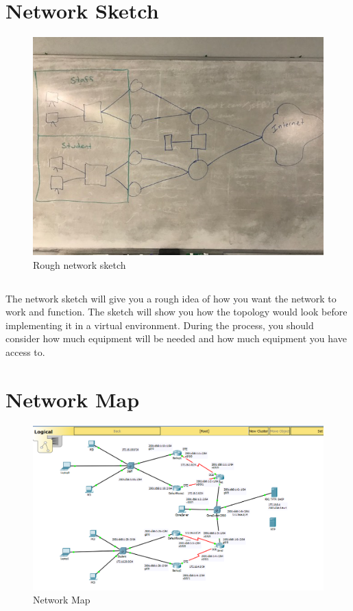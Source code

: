 \documentclass{article}
\begin{document}
\section{Network Sketch}
\begin{figure}[h]
		\includegraphics[width=1\linewidth]{2}
		\caption{Rough network sketch}
\end{figure}
\subsection{}
	The network sketch will give you a rough idea of how you want the network to work and function. The sketch will show you how the topology would look before implementing it in a virtual environment. During the process, you should consider how much equipment will be needed and how much equipment you have access to.
	\newpage
\section{Network Map}
\begin{figure}[h]
		\includegraphics[width=1\linewidth]{3}
		\caption{Network Map}
\end{figure}
\end{document}
